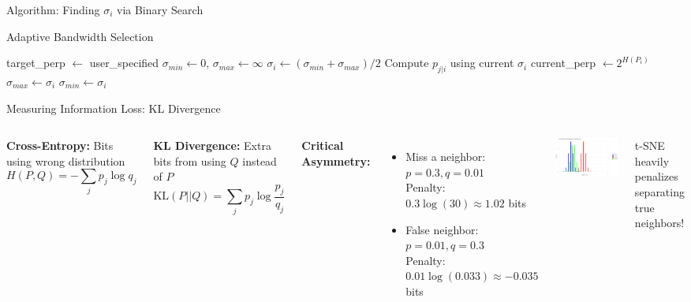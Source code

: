 \documentclass[aspectratio=169]{beamer}
\begin{document}
\begin{frame}{Algorithm: Finding $\sigma_i$ via Binary Search}
\begin{algorithm}[H]
\caption{Adaptive Bandwidth Selection}
\begin{algorithmic}[1]
\STATE target\_perp $\leftarrow$ user\_specified
\STATE $\sigma_{min} \leftarrow 0$, $\sigma_{max} \leftarrow \infty$
\STATE $\sigma_i \leftarrow (\sigma_{min} + \sigma_{max})/2$
\STATE Compute $p_{j|i}$ using current $\sigma_i$
\STATE current\_perp $\leftarrow 2^{H(P_i)}$
\STATE $\sigma_{max} \leftarrow \sigma_i$ 
\ELSE
\STATE $\sigma_{min} \leftarrow \sigma_i$ 
\ENDIF
\ENDWHILE
\ENDFOR
\end{algorithmic}
\end{algorithm}
\end{frame}

\begin{frame}{Measuring Information Loss: KL Divergence}
\begin{columns}
\textbf{Cross-Entropy:} Bits using wrong distribution
$$H(P,Q) = -\sum_j p_j \log q_j$$

\textbf{KL Divergence:} Extra bits from using $Q$ instead of $P$
$$\text{KL}(P||Q) = \sum_j p_j \log\frac{p_j}{q_j}$$

\textbf{Critical Asymmetry:}
\begin{itemize}
\item Miss a neighbor: $p=0.3, q=0.01$\\
Penalty: $0.3 \log(30) \approx 1.02$ bits
\item False neighbor: $p=0.01, q=0.3$\\
Penalty: $0.01 \log(0.033) \approx -0.035$ bits
\end{itemize}

\includegraphics[width=\textwidth]{./Figures/kl_divergence_asymmetry.png}

\colorbox{red!20}{t-SNE heavily penalizes\\separating true neighbors!}
\end{columns}
\end{frame}
\end{document}
